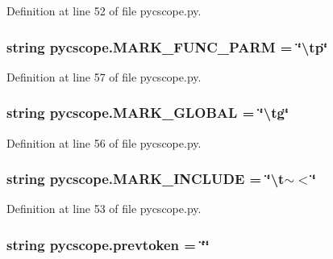 Definition at line 52 of file pycscope.\-py.

\hypertarget{namespacepycscope_a20d8c3d74d155f02a94315e224b47cc6}{
\subsubsection[{M\-A\-R\-K\-\_\-\-F\-U\-N\-C\-\_\-\-P\-A\-R\-M}]{\setlength{\rightskip}{0pt plus 5cm}string pycscope.\-M\-A\-R\-K\-\_\-\-F\-U\-N\-C\-\_\-\-P\-A\-R\-M = \char`\"{}\textbackslash{}tp\char`\"{}}}\label{namespacepycscope_a20d8c3d74d155f02a94315e224b47cc6}


Definition at line 57 of file pycscope.\-py.

\hypertarget{namespacepycscope_a67a8c20404ff1be3c26b903f5dc5614b}{
\subsubsection[{M\-A\-R\-K\-\_\-\-G\-L\-O\-B\-A\-L}]{\setlength{\rightskip}{0pt plus 5cm}string pycscope.\-M\-A\-R\-K\-\_\-\-G\-L\-O\-B\-A\-L = \char`\"{}\textbackslash{}tg\char`\"{}}}\label{namespacepycscope_a67a8c20404ff1be3c26b903f5dc5614b}


Definition at line 56 of file pycscope.\-py.

\hypertarget{namespacepycscope_a2269ada09ac36e7514d0d1dc7c42bbc3}{
\subsubsection[{M\-A\-R\-K\-\_\-\-I\-N\-C\-L\-U\-D\-E}]{\setlength{\rightskip}{0pt plus 5cm}string pycscope.\-M\-A\-R\-K\-\_\-\-I\-N\-C\-L\-U\-D\-E = \char`\"{}\textbackslash{}t$\sim$$<$\char`\"{}}}\label{namespacepycscope_a2269ada09ac36e7514d0d1dc7c42bbc3}


Definition at line 53 of file pycscope.\-py.

\hypertarget{namespacepycscope_aea25d07f1c7d3231a6a2f9fde8cf1abc}{
\subsubsection[{prevtoken}]{\setlength{\rightskip}{0pt plus 5cm}string pycscope.\-prevtoken = \char`\"{}\char`\"{}}}\label{namespacepycscope_aea25d07f1c7d3231a6a2f9fde8cf1abc}


